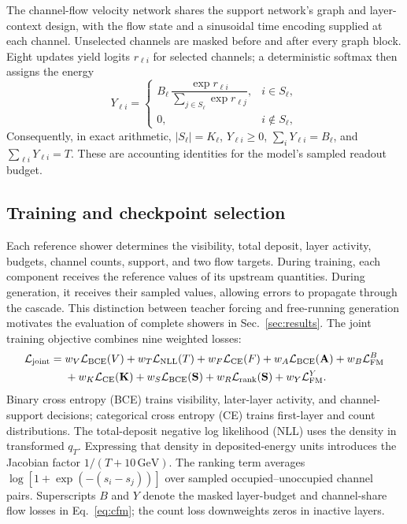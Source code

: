 \documentclass[11pt]{article}
\newcommand{\GeV}{\,\mathrm{GeV}}
\begin{document}
The channel-flow velocity network shares the support network's graph and layer-context design, with the flow state and a sinusoidal time encoding supplied at each channel. Unselected channels are masked before and after every graph block. Eight updates yield logits $r_{\ell i}$ for selected channels; a deterministic softmax then assigns the energy
\begin{equation}
 Y_{\ell i}=
 \begin{cases}
 B_\ell\,\dfrac{\exp r_{\ell i}}{\sum_{j\in S_\ell}\exp r_{\ell j}}, & i\in S_\ell,\\[6pt]
 0, & i\notin S_\ell,
 \end{cases}
 \label{eq:decoder}
\end{equation}
Consequently, in exact arithmetic, $|S_\ell|=K_\ell$, $Y_{\ell i}\geq0$, $\sum_iY_{\ell i}=B_\ell$, and $\sum_{\ell i}Y_{\ell i}=T$. These are accounting identities for the model's sampled readout budget.

\subsection{Training and checkpoint selection}

Each reference shower determines the visibility, total deposit, layer activity, budgets, channel counts, support, and two flow targets. During training, each component receives the reference values of its upstream quantities. During generation, it receives their sampled values, allowing errors to propagate through the cascade. This distinction between teacher forcing and free-running generation motivates the evaluation of complete showers in Sec.~\ref{sec:results}. The joint training objective combines nine weighted losses:
\begin{equation}
 \begin{aligned}
 \mathcal L_{\rm joint}={}&w_V\mathcal L_{\rm BCE}(V)
 +w_T\mathcal L_{\rm NLL}(T)
 +w_F\mathcal L_{\rm CE}(F)
 +w_A\mathcal L_{\rm BCE}(\mathbf A)
 +w_B\mathcal L_{\rm FM}^{B}\\
 &+w_K\mathcal L_{\rm CE}(\mathbf K)
 +w_S\mathcal L_{\rm BCE}(\mathbf S)
 +w_R\mathcal L_{\rm rank}(\mathbf S)
 +w_Y\mathcal L_{\rm FM}^{Y}.
 \end{aligned}
 \label{eq:joint_loss}
\end{equation}
Binary cross entropy (BCE) trains visibility, later-layer activity, and channel-support decisions; categorical cross entropy (CE) trains first-layer and count distributions. The total-deposit negative log likelihood (NLL) uses the density in transformed $q_T$. Expressing that density in deposited-energy units introduces the Jacobian factor $1/(T+10\GeV)$. The ranking term averages $\log[1+\exp(-(s_i-s_j))]$ over sampled occupied--unoccupied channel pairs. Superscripts $B$ and $Y$ denote the masked layer-budget and channel-share flow losses in Eq.~\eqref{eq:cfm}; the count loss downweights zeros in inactive layers.
\end{document}
